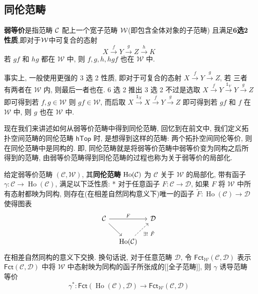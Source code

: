 \subsection{同伦范畴}
\begin{definition}[弱等价范畴]
    \textbf{弱等价}是指范畴 $\cal{C}$ 配上一个宽子范畴 $\cal{W}$(即包含全体对象的子范畴) 
    且满足\textbf{6选2性质},即对于$\cal{W}$中可复合的态射 
    \[
    X\xrightarrow{f}Y \xrightarrow{g}Z \xrightarrow{h} K
    \] 
    若 $gf$ 和 $hg$ 都在 $\mathcal{W}$ 中, 则 $f,g,h,hgf$ 也在 $\mathcal{W}$ 中.
\end{definition}
\begin{remark}
    事实上, 一般使用更强的 3 选 2 性质, 即对于可复合的态射 $X \xrightarrow{f} Y \xrightarrow{g} Z$, 若
    三者有两者在 $\mathcal{W}$ 内, 则最后一者也在. 6 选 2 推出 3 选 2 不过是选取 
    $X \xrightarrow{f} Y \xrightarrow{\mathbb{1}_Y} Y \xrightarrow{g} Z$
    即可得到若 $f, g \in \mathcal{W}$ 则 $gf\in \mathcal{W}$, 而后取 
    $X\xrightarrow{\mathbb{1}_X} X \xrightarrow{f}Y \xrightarrow{g} Z$ 
    即可得到若 $gf$ 和 $f$ 在 $\mathcal{W}$ 中, 则 $g$ 也在 $\mathcal{W}$ 中.
\end{remark}
现在我们来讲述如何从弱等价范畴中得到同伦范畴, 回忆到在前文中, 
我们定义拓扑空间范畴的同伦范畴 $\mathsf{hTop}$ 时, 是想得到这样的范畴: 两个拓扑空间同伦等价, 则在同伦范畴中是同构的.
即, 同伦范畴就是将弱等价范畴中弱等价变为同构之后所得到的范畴, 由弱等价范畴得到同伦范畴的过程也称为关于弱等价的局部化.
\begin{definition}[同伦范畴]
    给定弱等价范畴 $(\mathcal{C},\mathcal{W})$, 其\textbf{同伦范畴} $\operatorname{Ho}(\cal{C})$ 
    为 $\mathcal{C}$ 关于 $\mathcal{W}$ 的局部化, 带有函子 $\gamma \colon \mathcal{C} \to \operatorname{Ho}(\mathcal{C})$,
    满足以下泛性质:
    * 对于任意函子 $F\colon \mathcal{C} \to \mathcal{D}$, 如果 $F$ 将 $\mathcal{W}$ 中所有态射都映为同构,
    则存在(在相差自然同构意义下)唯一的函子 $\tilde{F} \colon \operatorname{Ho}(\mathcal{C}) \to \mathcal{D}$
    使得图表
    \[ \begin{tikzcd}[column sep=10pt]
                \mathcal{C} \ar[rr,"F"]\ar[dr] & & \mathcal{D}\\
                & \operatorname{Ho}(\mathcal{C}) \ar[ur,dashed,"\exists!\ \tilde F"']
    \end{tikzcd} \]
    在相差自然同构的意义下交换.
    换句话说, 对于任意范畴 $\mathcal{D}$, 令 $\mathsf{Fct}_{\mathcal{W}}(\mathcal{C},\mathcal{D})$ 
    表示 $\mathsf{Fct}(\mathcal{C},\mathcal{D})$ 中将 $\mathcal{W}$ 中态射映为同构的函子所张成的[[全子范畴]], 则
    $\gamma$ 诱导范畴等价
    \[
        \gamma^* \colon \mathsf{Fct}(\operatorname{Ho}(\mathcal{C}),\mathcal{D}) \to\mathsf{Fct}_{\mathcal{W}}(\mathcal{C},\mathcal{D})
    \]
\end{definition}
